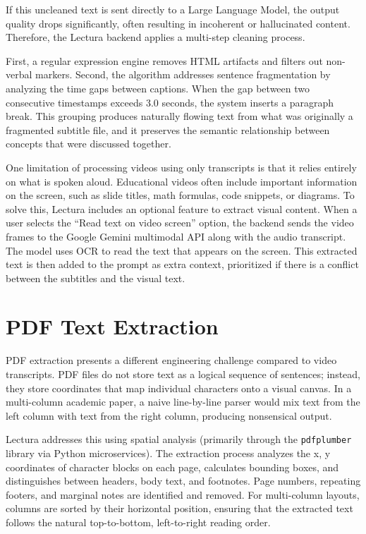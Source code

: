 If this uncleaned text is sent directly to a Large Language Model, the output quality drops significantly, often resulting in incoherent or hallucinated content. Therefore, the Lectura backend applies a multi-step cleaning process.

First, a regular expression engine removes HTML artifacts and filters out non-verbal markers. Second, the algorithm addresses sentence fragmentation by analyzing the time gaps between captions. When the gap between two consecutive timestamps exceeds 3.0 seconds, the system inserts a paragraph break. This grouping produces naturally flowing text from what was originally a fragmented subtitle file, and it preserves the semantic relationship between concepts that were discussed together.

One limitation of processing videos using only transcripts is that it relies entirely on what is spoken aloud. Educational videos often include important information on the screen, such as slide titles, math formulas, code snippets, or diagrams. To solve this, Lectura includes an optional feature to extract visual content. When a user selects the ``Read text on video screen'' option, the backend sends the video frames to the Google Gemini multimodal API along with the audio transcript. The model uses OCR to read the text that appears on the screen. This extracted text is then added to the prompt as extra context, prioritized if there is a conflict between the subtitles and the visual text.

\section{PDF Text Extraction}
PDF extraction presents a different engineering challenge compared to video transcripts. PDF files do not store text as a logical sequence of sentences; instead, they store coordinates that map individual characters onto a visual canvas. In a multi-column academic paper, a naive line-by-line parser would mix text from the left column with text from the right column, producing nonsensical output.

Lectura addresses this using spatial analysis (primarily through the \texttt{pdfplumber} library via Python microservices). The extraction process analyzes the x, y coordinates of character blocks on each page, calculates bounding boxes, and distinguishes between headers, body text, and footnotes. Page numbers, repeating footers, and marginal notes are identified and removed. For multi-column layouts, columns are sorted by their horizontal position, ensuring that the extracted text follows the natural top-to-bottom, left-to-right reading order.

